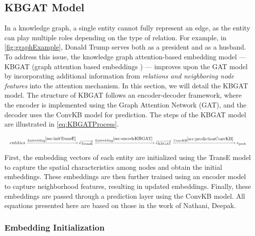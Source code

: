 \subsection{KBGAT Model}

In a knowledge graph, a single entity cannot fully represent an edge, as the entity can play multiple roles depending on the type of relation. For example, in \autoref{fig:graphExample}, Donald Trump serves both as a president and as a husband. To address this issue, the knowledge graph attention-based embedding model — KBGAT (graph attention based embeddings \cite{nathani2019learning}) — improves upon the GAT model by incorporating additional information from \textit{relations and neighboring node features} into the attention mechanism. In this section, we will detail the KBGAT model. The structure of KBGAT follows an encoder-decoder framework, where the encoder is implemented using the Graph Attention Network (GAT), and the decoder uses the ConvKB model for prediction. The steps of the KBGAT model are illustrated in \ref{eq:KBGATProcess}.

\begin{equation*}
	\label{eq:KBGATProcess}
	\resizebox{\linewidth}{!}{$
		entities \xrightarrow{\text{Embedding}^{\ref{sec:initTransE}}} \overrightarrow{e_{\text{TransE}}} \xrightarrow{\text{Embedding}^{\ref{sec:encodeKBGAT}}} \overrightarrow{e_{\text{KBGAT}}} \xrightarrow{\text{ConvKB}^{\ref{sec:predictionConvKB}}} e_{\text{prob}}
		$}
\end{equation*}


First, the embedding vectors of each entity are initialized using the TransE model to capture the spatial characteristics among nodes and obtain the initial embeddings. These embeddings are then further trained using an encoder model to capture neighborhood features, resulting in updated embeddings. Finally, these embeddings are passed through a prediction layer using the ConvKB model. All equations presented here are based on those in the work of Nathani, Deepak\cite{nathani2019learning}.




\subsubsection{Embedding Initialization}
\label{sec:initTransE}

